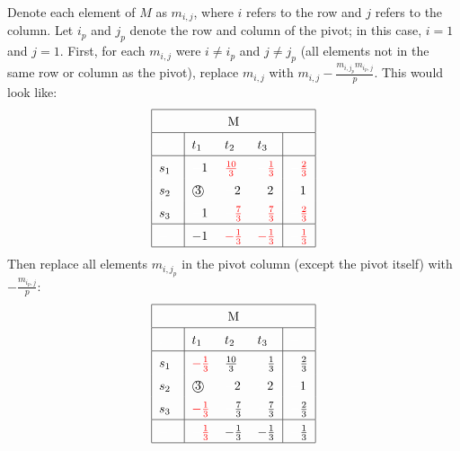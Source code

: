 \documentclass[11pt]{article}
\begin{document}
Denote each element of $M$ as $m_{i,j}$, where $i$ refers to the row
and $j$ refers to the column. Let $i_p$ and $j_p$ denote the row and
column of the pivot; in this case, $i=1$ and $j=1$. First, for each
$m_{i,j}$ were $i\neq i_p$ and $j\neq j_p$ (all elements not in the same row
or column as the pivot), replace $m_{i,j}$ with
$m_{i,j}-\frac{m_{i,j_p}m_{i_p,j}}{p}$. This would look like:
\begin{equation*}
\renewcommand{\arraystretch}{1.5}
\begin{tabular}{ |p{0.5cm}|p{0.5cm} p{0.5cm} p{0.5cm}|p{0.5cm}| }
\hline
\multicolumn{5}{|c|}{M} \\
\hline
\textcolor{white}{.}& $t_1$ & $t_2$ & $t_3$ & $\textcolor{white}{-}$\\
\hline
$s_1$ & $\textcolor{white}{-}$1 & \textcolor{red}{$\frac{10}{3}$} & $\textcolor{white}{-}$\textcolor{red}{$\frac{1}{3}$} & $\textcolor{white}{-}$\textcolor{red}{$\frac{2}{3}$}\\
$s_2$ & \textcircled{3} & $\textcolor{white}{-}$2 & $\textcolor{white}{-}$2 & $\textcolor{white}{-}$1\\
$s_3$ & $\textcolor{white}{-}$1 & $\textcolor{white}{-}$\textcolor{red}{$\frac{7}{3}$} & $\textcolor{white}{-}$\textcolor{red}{$\frac{7}{3}$} & $\textcolor{white}{-}$\textcolor{red}{$\frac{2}{3}$}\\
\hline
$\textcolor{white}{-}$ & $-1$ & \textcolor{red}{$-\frac{1}{3}$} & \textcolor{red}{$-\frac{1}{3}$} & $\textcolor{white}{-}$\textcolor{red}{$\frac{1}{3}$}\\
\hline
\end{tabular}
\end{equation*}
Then replace all elements $m_{i,j_p}$ in the pivot column (except the
pivot itself) with $-\frac{m_{i_p,j}}{p}$:
\begin{equation*}
\renewcommand{\arraystretch}{1.5}
\begin{tabular}{ |p{0.5cm}|p{0.5cm} p{0.5cm} p{0.5cm}|p{0.5cm}| }
\hline
\multicolumn{5}{|c|}{M} \\
\hline
\textcolor{white}{.}& $t_1$ & $t_2$ & $t_3$ & $\textcolor{white}{-}$\\
\hline
$s_1$ & \textcolor{red}{$-\frac{1}{3}$} & $\frac{10}{3}$ & $\textcolor{white}{-}$$\frac{1}{3}$ & $\textcolor{white}{-}$$\frac{2}{3}$\\
$s_2$ & \textcircled{3} & $\textcolor{white}{-}$2 & $\textcolor{white}{-}$2 & $\textcolor{white}{-}$1\\
$s_3$ & \textcolor{red}{$-\frac{1}{3}$} & $\textcolor{white}{-}$$\frac{7}{3}$ & $\textcolor{white}{-}$$\frac{7}{3}$ & $\textcolor{white}{-}$$\frac{2}{3}$\\
\hline
$\textcolor{white}{-}$ & $\textcolor{white}{-}$\textcolor{red}{$\frac{1}{3}$} & $-\frac{1}{3}$ & $-\frac{1}{3}$ & $\textcolor{white}{-}$$\frac{1}{3}$\\
\hline
\end{tabular}
\end{equation*}
\end{document}
